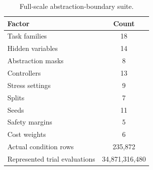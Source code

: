 \begin{table}[t]
\centering
\caption{Full-scale abstraction-boundary suite.}
\label{tab:scale}
\small
\begin{tabular}{lc}
\toprule
Factor & Count \\
\midrule
Task families & 18 \\
Hidden variables & 14 \\
Abstraction masks & 8 \\
Controllers & 13 \\
Stress settings & 9 \\
Splits & 7 \\
Seeds & 11 \\
Safety margins & 5 \\
Cost weights & 6 \\
Actual condition rows & 235,872 \\
Represented trial evaluations & 34,871,316,480 \\
\bottomrule
\end{tabular}
\end{table}
